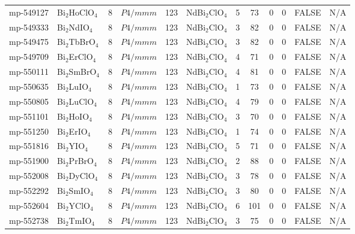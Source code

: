 {\begin{longtable}{llcccccccccc}
    mp-549127 & Bi$_{2}$HoClO$_{4}$ & 8     & $P4/mmm$ & 123   & NdBi$_{2}$ClO$_{4}$ & 5     & 73    & 0     & 0     & FALSE & N/A \\
    mp-549333 & Bi$_{2}$NdIO$_{4}$ & 8     & $P4/mmm$ & 123   & NdBi$_{2}$ClO$_{4}$ & 3     & 82    & 0     & 0     & FALSE & N/A \\
    mp-549475 & Bi$_{2}$TbBrO$_{4}$ & 8     & $P4/mmm$ & 123   & NdBi$_{2}$ClO$_{4}$ & 3     & 82    & 0     & 0     & FALSE & N/A \\
    mp-549709 & Bi$_{2}$ErClO$_{4}$ & 8     & $P4/mmm$ & 123   & NdBi$_{2}$ClO$_{4}$ & 4     & 71    & 0     & 0     & FALSE & N/A \\
    mp-550111 & Bi$_{2}$SmBrO$_{4}$ & 8     & $P4/mmm$ & 123   & NdBi$_{2}$ClO$_{4}$ & 4     & 81    & 0     & 0     & FALSE & N/A \\
    mp-550635 & Bi$_{2}$LuIO$_{4}$ & 8     & $P4/mmm$ & 123   & NdBi$_{2}$ClO$_{4}$ & 1     & 73    & 0     & 0     & FALSE & N/A \\
    mp-550805 & Bi$_{2}$LuClO$_{4}$ & 8     & $P4/mmm$ & 123   & NdBi$_{2}$ClO$_{4}$ & 4     & 79    & 0     & 0     & FALSE & N/A \\
    mp-551101 & Bi$_{2}$HoIO$_{4}$ & 8     & $P4/mmm$ & 123   & NdBi$_{2}$ClO$_{4}$ & 3     & 70    & 0     & 0     & FALSE & N/A \\
    mp-551250 & Bi$_{2}$ErIO$_{4}$ & 8     & $P4/mmm$ & 123   & NdBi$_{2}$ClO$_{4}$ & 1     & 74    & 0     & 0     & FALSE & N/A \\
    mp-551816 & Bi$_{2}$YIO$_{4}$ & 8     & $P4/mmm$ & 123   & NdBi$_{2}$ClO$_{4}$ & 5     & 71    & 0     & 0     & FALSE & N/A \\
    mp-551900 & Bi$_{2}$PrBrO$_{4}$ & 8     & $P4/mmm$ & 123   & NdBi$_{2}$ClO$_{4}$ & 2     & 88    & 0     & 0     & FALSE & N/A \\
    mp-552008 & Bi$_{2}$DyClO$_{4}$ & 8     & $P4/mmm$ & 123   & NdBi$_{2}$ClO$_{4}$ & 3     & 78    & 0     & 0     & FALSE & N/A \\
    mp-552292 & Bi$_{2}$SmIO$_{4}$ & 8     & $P4/mmm$ & 123   & NdBi$_{2}$ClO$_{4}$ & 3     & 80    & 0     & 0     & FALSE & N/A \\
    mp-552604 & Bi$_{2}$YClO$_{4}$ & 8     & $P4/mmm$ & 123   & NdBi$_{2}$ClO$_{4}$ & 6     & 101   & 0     & 0     & FALSE & N/A \\
    mp-552738 & Bi$_{2}$TmIO$_{4}$ & 8     & $P4/mmm$ & 123   & NdBi$_{2}$ClO$_{4}$ & 3     & 75    & 0     & 0     & FALSE & N/A \\

\end{longtable}}
